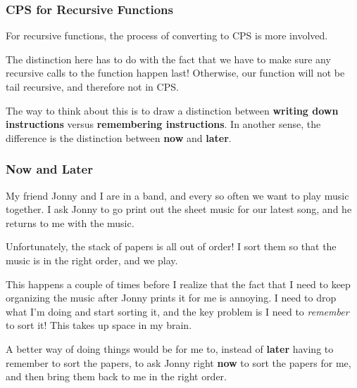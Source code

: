 \documentclass[aspectratio=169, handout]{beamer}
\begin{document}
\begin{frame}[fragile]
  \frametitle{CPS for Recursive Functions}

  For recursive functions, the process of converting to CPS is more involved.

  \pause
  \vspace{\fill}

  The distinction here has to do with the fact that we have to make sure any
  recursive calls to the function happen last! Otherwise, our function will
  not be tail recursive, and therefore not in CPS.

  \pause
  \vspace{\fill}

  The way to think about this is to draw a distinction between
  \textbf{writing down instructions} versus \textbf{remembering instructions}.
  In another sense, the difference is the distinction between \textbf{now}
  and \textbf{later}. 
\end{frame}

\begin{frame}[fragile]
  \frametitle{Now and Later}

  \pause
  My friend Jonny and I are in a band, and every so often we want to play music
  together. I ask Jonny to go print out the sheet music for our latest song,
  and he returns to me with the music.

  \pause
  \vspace{\fill}

  Unfortunately, the stack of papers is all out of order! I sort them so that the
  music is in the right order, and we play.

  \pause
  \vspace{\fill}

  This happens a couple of times before I realize that the fact that I need to keep
  organizing the music after Jonny prints it for me is annoying. I need to drop
  what I'm doing and start sorting it, and the key problem is I need to \textit{remember}
  to sort it! This takes up space in my brain. 

  \pause
  \vspace{\fill}

  A better way of doing things would be for me to, instead of \textbf{later}
  having to remember to sort the papers, to ask Jonny right \textbf{now} to 
  sort the papers for me, and then bring them back to me in the right order. 
\end{frame}
\end{document}
